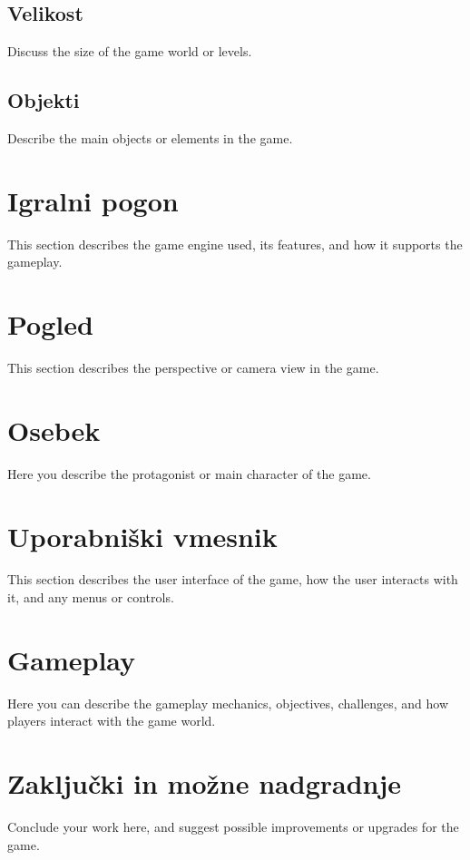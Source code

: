 \documentclass[a4paper,12pt]{article}
\begin{document}
\subsection{Velikost}
\noindent Discuss the size of the game world or levels.

\subsection{Objekti}
\noindent Describe the main objects or elements in the game.

\newpage

\section{Igralni pogon}
\noindent This section describes the game engine used, its features, and how it supports the gameplay.

\newpage

\section{Pogled}
\noindent This section describes the perspective or camera view in the game.

\newpage

\section{Osebek}
\noindent Here you describe the protagonist or main character of the game.

\newpage

\section{Uporabniški vmesnik}
\noindent This section describes the user interface of the game, how the user interacts with it, and any menus or controls.

\newpage

\section{Gameplay}
\noindent Here you can describe the gameplay mechanics, objectives, challenges, and how players interact with the game world.

\newpage

\section{Zaključki in možne nadgradnje}
\noindent Conclude your work here, and suggest possible improvements or upgrades for the game.
\end{document}
